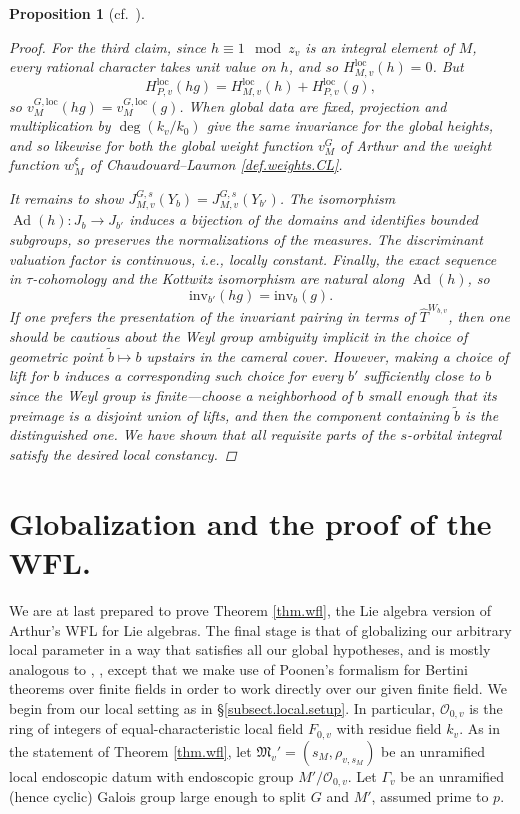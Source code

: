\documentclass[openany]{amsbook}
\newtheorem{proposition}[theorem]{Proposition}
\theoremstyle{definition}
\theoremstyle{remark}
\numberwithin{equation}{section}
\renewcommand{\O}{\mathcal{O}}
\renewcommand{\-}{\operatorname{-}}
\newcommand{\on}[1]{\operatorname{#1}}
\newcommand{\wtilde}[1]{\widetilde{#1}}
\newcommand{\fM}{\mathfrak{M}}
\newcommand{\Ad}{\on{Ad}}
\newcommand{\inv}{\mathrm{inv}}
\newcommand{\loc}{\mathrm{loc}}
\begin{document}
\begin{proposition}[{cf.\ \cite[\S 18.7]{CLII}}]
\begin{proof}
        For the third claim, since $h \equiv 1 \mod z_v$ is an integral element of $M$, every rational character takes unit value on $h$, and so $H_{M,v}^{\loc}(h) = 0$. But
        $$
            H_{P,v}^{\loc}(hg) = H_{M,v}^{\loc}(h) + H_{P,v}^{\loc}(g),
        $$
        so $v_M^{G,\loc}(hg) = v_M^{G, \loc}(g)$. When global data are fixed, projection and multiplication by $\deg(k_v/k_0)$ give the same invariance for the global heights, and so likewise for both the global weight function $v_M^G$ of Arthur and the weight function $w_M^\xi$ of Chaudouard--Laumon \ref{def.weights.CL}.

        It remains to show $J_{M,v}^{G,s}(Y_b) = J_{M,v}^{G,s}(Y_{b'})$. The isomorphism $\Ad(h) : J_b \to J_{b'}$ induces a bijection of the domains and identifies bounded subgroups, so preserves the normalizations of the measures. The discriminant valuation factor is continuous, i.e., locally constant. Finally, the exact sequence in $\tau$-cohomology and the Kottwitz isomorphism are natural along $\Ad(h)$, so 
        $$
            \inv_{b'}(hg) = \inv_b(g).
        $$
        If one prefers the presentation of the invariant pairing in terms of $\widehat{T}^{W_{b,v}}$, then one should be cautious about the Weyl group ambiguity implicit in the choice of geometric point $\wtilde{b} \mapsto b$ upstairs in the cameral cover. However, making a choice of lift for ${b}$ induces a corresponding such choice for every $b'$ sufficiently close to $b$ since the Weyl group is finite---choose a neighborhood of $b$ small enough that its preimage is a disjoint union of lifts, and then the component containing $\wtilde{b}$ is the distinguished one. We have shown that all requisite parts of the $s$-orbital integral satisfy the desired local constancy.
    \end{proof}
\end{proposition}


\section{Globalization and the proof of the WFL.}\label{subsect.globalize.param}

We are at last prepared to prove Theorem \ref{thm.wfl}, the Lie algebra version of Arthur's WFL for Lie algebras. The final stage is that of globalizing our arbitrary local parameter in a way that satisfies all our global hypotheses, and is mostly analogous to \cite[Theorem 19.1.1]{CLII}, \cite[\S 8.6]{ngofl}, except that we make use of Poonen's formalism for Bertini theorems over finite fields in order to work directly over our given finite field. We begin from our local setting as in \S \ref{subsect.local.setup}. In particular, $\O_{0,v}$ is the ring of integers of equal-characteristic local field $F_{0,v}$ with residue field $k_v$. As in the statement of Theorem \ref{thm.wfl}, let $\fM_v' = (s_M, \rho_{v, s_M})$ be an unramified local endoscopic datum with endoscopic group $M'/\O_{0,v}$. Let $\Gamma_v$ be an unramified (hence cyclic) Galois group large enough to split $G$ and $M'$, assumed prime to $p$. 
\end{document}
